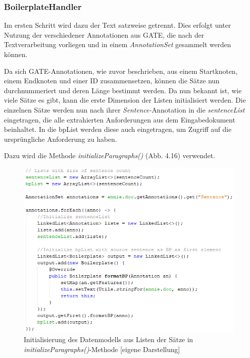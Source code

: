 \documentclass[12pt]{report}
\begin{document}
\subsubsection{BoilerplateHandler}
Im ersten Schritt wird dazu der Text satzweise getrennt. Dies erfolgt unter Nutzung der verschiedener Annotationen aus GATE, die nach der Textverarbeitung vorliegen und in einem \textit{AnnotationSet} gesammelt werden können.

Da sich GATE-Annotationen, wie zuvor beschrieben, aus einem Startknoten, einem Endknoten und einer ID zusammensetzen, können die Sätze nun durchnummeriert und deren Länge bestimmt werden. Da nun bekannt ist, wie viele Sätze es gibt, kann die erste Dimension der Listen initialisiert werden. Die einzelnen Sätze werden nun nach ihrer \textit{Sentence-}Annotation in die \textit{sentenceList} eingetragen, die alle extrahierten Anforderungen aus dem Eingabedokument beinhaltet. In die bpList werden diese auch eingetragen, um Zugriff auf die ursprüngliche Anforderung zu haben. 

Dazu wird die Methode \textit{initializeParagraphs()} (Abb. 4.16) verwendet.

\begin{figure}[h!]
\begin{center}
\includegraphics[scale=1]{Bilder/BoilerplateHandler-initializeParagraphs.png}
\caption{Initialisierung des Datenmodells aus Listen der Sätze in \textit{initializeParagraphs()}-Methode [eigene Darstellung]}
\end{center}
\end{figure}
\end{document}

